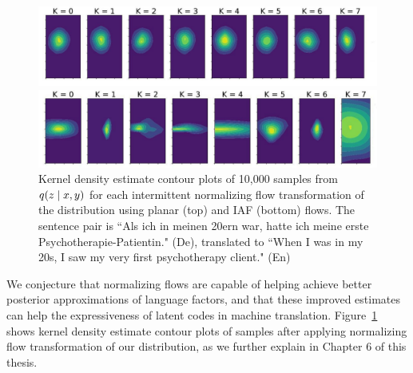 \begin{figure}[ht]

	\vskip 0.2in
	\begin{center}
		\centerline{\includegraphics[width=\columnwidth]{planar_flows_plot_edited.pdf}}
		\centerline{\includegraphics[width=\columnwidth]{iaf_flows_plot_edited.pdf}}
		\caption{Kernel density estimate contour plots of 10,000 samples from $q(z \; | \;{x, y})$ for each intermittent normalizing flow transformation of the distribution using planar (top) and \ac{IAF} (bottom) flows. The sentence pair is ``Als ich in meinen 20ern war, hatte ich meine erste Psychotherapie-Patientin." (De), translated to ``When I was in my 20s, I saw my very first psychotherapy client." (En)}
	\label{fig:flowsplot}
	\end{center}
	\vskip -0.2in
	\vspace{-4mm}
\end{figure}

We conjecture that normalizing flows are capable of helping achieve better posterior approximations of language factors, and that these improved estimates can help the expressiveness of latent codes in machine translation. Figure~\ref{fig:flowsplot} shows kernel density estimate contour plots of samples after applying normalizing flow transformation
of our distribution, as we further explain in Chapter 6 of this thesis.


